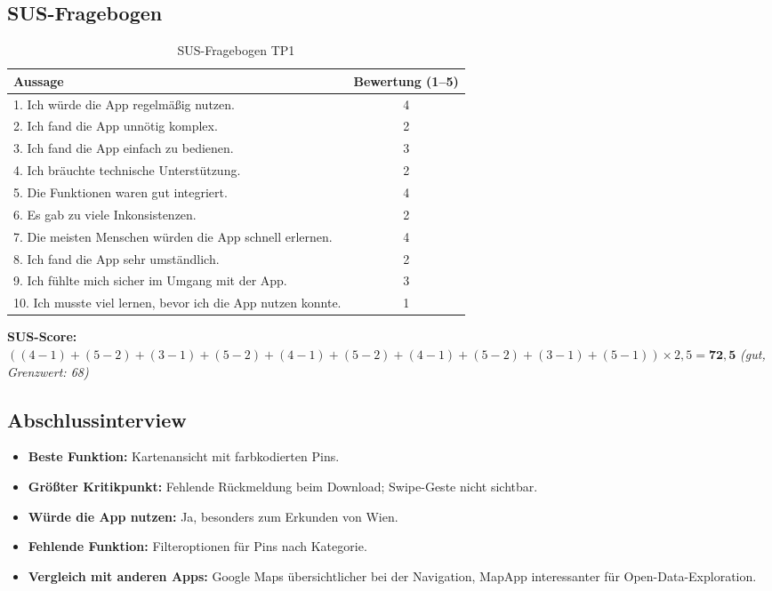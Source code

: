 \documentclass{article}
\begin{document}
\subsection*{SUS-Fragebogen}

\begin{table}[H]
    \centering
    \begin{tabular}{|l|c|}
        \hline
        \textbf{Aussage} & \textbf{Bewertung (1–5)} \\
        \hline
        1. Ich würde die App regelmäßig nutzen. & 4 \\
        \hline
        2. Ich fand die App unnötig komplex. & 2 \\
        \hline
        3. Ich fand die App einfach zu bedienen. & 3 \\
        \hline
        4. Ich bräuchte technische Unterstützung. & 2 \\
        \hline
        5. Die Funktionen waren gut integriert. & 4 \\
        \hline
        6. Es gab zu viele Inkonsistenzen. & 2 \\
        \hline
        7. Die meisten Menschen würden die App schnell erlernen. & 4 \\
        \hline
        8. Ich fand die App sehr umständlich. & 2 \\
        \hline
        9. Ich fühlte mich sicher im Umgang mit der App. & 3 \\
        \hline
        10. Ich musste viel lernen, bevor ich die App nutzen konnte. & 1 \\
        \hline
    \end{tabular}
    \caption{SUS-Fragebogen TP1}
\end{table}

\textbf{SUS-Score:} $((4-1)+(5-2)+(3-1)+(5-2)+(4-1)+(5-2)+(4-1)+(5-2)+(3-1)+(5-1)) \times 2{,}5 = \mathbf{72{,}5}$
\quad \textit{(gut, Grenzwert: 68)}

\subsection*{Abschlussinterview}

\begin{itemize}
    \item \textbf{Beste Funktion:} Kartenansicht mit farbkodierten Pins.
    \item \textbf{Größter Kritikpunkt:} Fehlende Rückmeldung beim Download; Swipe-Geste nicht sichtbar.
    \item \textbf{Würde die App nutzen:} Ja, besonders zum Erkunden von Wien.
    \item \textbf{Fehlende Funktion:} Filteroptionen für Pins nach Kategorie.
    \item \textbf{Vergleich mit anderen Apps:} Google Maps übersichtlicher bei der Navigation,
          MapApp interessanter für Open-Data-Exploration.
\end{itemize}
\end{document}
